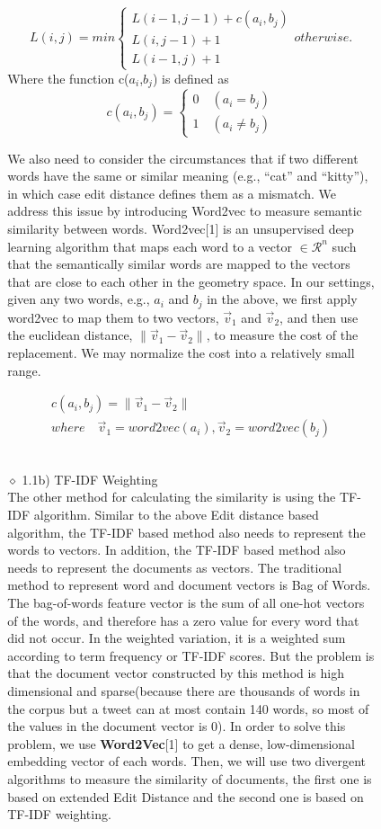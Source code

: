 \documentclass[10pt]{article}
\begin{document}
\begin{itemize}
\begin{itemize}
\begin{itemize}
\begin{itemize}
$$
L(i, j) = min
\left\{
\begin{array}{ll}
L(i-1, j-1) + c(a_i,b_j) \\
L(i, j-1) +1 \\
L(i-1, j) +1
\end{array}
\right.
otherwise.
$$
Where the function c($a_i$,$b_j$) is defined as
$$
c(a_i, b_j)=
\left\{
\begin{array}{ll}
0 \quad (a_i = b_j) \\
1 \quad (a_i \neq b_j)
\end{array}
\right.
$$

We also need to consider the circumstances that if two different words have the same or similar meaning (e.g., “cat” and “kitty”), in which case edit distance defines them as a mismatch. We address this issue by introducing Word2vec to measure semantic similarity between words. 
{\sf Word2vec}[1] is an unsupervised  deep learning algorithm that maps each word to a vector  $\in \mathcal{R}^n$ such that the semantically similar words are mapped to the vectors that are close to each other in the geometry space. 
In our settings, given any two words, e.g.,  $a_i$ and $b_j$ in the above, we first apply word2vec to map them to two vectors, $\vec{v}_1$ and $\vec{v}_2$, and then use the euclidean distance, $\lVert \vec{v}_1 - \vec{v}_2 \rVert$, to measure the cost of the replacement.
We may normalize the cost into a relatively small range. 

$$
\begin{array}{c}
c(a_i, b_j)=\lVert \vec{v}_1 - \vec{v}_2 \rVert \\
where \quad  \vec{v}_1 = word2vec(a_i), \vec{v}_2=word2vec(b_j)
\end{array}
$$
\\
\item[$\diamond$]{1.1b) TF-IDF Weighting}\\
The other method for calculating the similarity is using the TF-IDF algorithm. 
Similar to the above Edit distance based algorithm,  the TF-IDF based method also needs to represent the words  to vectors. In addition, the TF-IDF based method also needs to represent the documents as vectors. The traditional method to represent word and document vectors is Bag of Words. The bag-of-words feature vector is the sum of all one-hot vectors of the words, and therefore has a zero value for every word that  did not occur. In the weighted variation, it is a weighted sum according to term frequency or TF-IDF scores. But the problem is that the document vector constructed by this method is high dimensional and sparse(because there are thousands of words in the corpus but a tweet can at most contain 140 words, so most of the values in the document vector is 0). In order to solve this problem, we use  {\bf Word2Vec}[1] to get a dense, low-dimensional embedding vector of each words. Then, we will use two divergent algorithms to measure the similarity of documents, the first one is based on extended  Edit Distance and the second one is based on TF-IDF weighting.\\\\



\end{itemize}
\end{itemize}
\end{itemize}
\end{itemize}
\end{document}
